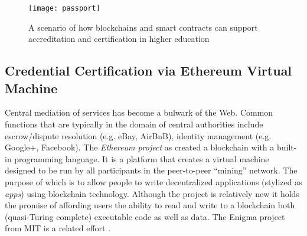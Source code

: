 \begin{figure}[tb]
  \center 
  \texttt{[image: passport]}
  \caption{A scenario of how blockchains and smart contracts can support accreditation and certification in higher education} 
  \label{fig:passport}
\end{figure} 


\subsection{Credential Certification via Ethereum Virtual Machine}

Central mediation of services has become a bulwark of the Web. 
Common functions that are typically in the domain of central authorities include escrow/dispute resolution (e.g. eBay, AirBnB), identity management (e.g. Google+, Facebook). 
The \emph{Ethereum project} as created a blockchain with a built-in programming language. 
It is a platform that creates a virtual machine designed to be run by all participants in the peer-to-peer ``mining'' network. 
The purpose of which is to allow people to write decentralized applications (stylized as \textit{\DJ{}apps}) using blockchain technology. 
Although the project is relatively new \cite{wood2014ethereum} it holds the promise of affording users the ability to read and write to a blockchain both (quasi-Turing complete) executable code as well as data. 
The Enigma project from MIT is a related effort \cite{zyskind2015enigma}.

